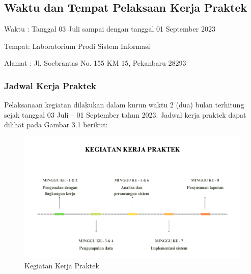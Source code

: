 %


%


\chapter{\babTiga}
\section{Waktu dan Tempat Pelaksaan Kerja Praktek}
Waktu	: Tanggal 03 Juli sampai dengan tanggal 01 September 2023

Tempat: Laboratorium Prodi Sistem Informasi

Alamat	: Jl. Soebrantas No. 155 KM 15, Pekanbaru 28293

\subsection{Jadwal Kerja Praktek}
Pelaksanaan kegiatan dilakukan dalam kurun waktu 2 (dua) bulan terhitung sejak tanggal 03 Juli – 01 September tahun 2023. Jadwal kerja praktek dapat dilihat pada Gambar 3.1 berikut:

\begin{figure}
  \centering
  \includegraphics[width=0.82\linewidth]{konten//gambar/kegiatan kerja praktek.png}
  \caption{Kegiatan Kerja Praktek}
  \label{fig:enter-label}
\end{figure}
